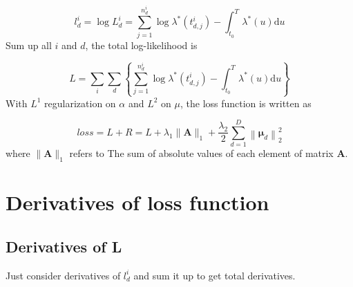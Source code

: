 \documentclass{article}
\begin{document}
		\begin{equation}
			l^i_d = \log L^i_d = \sum_{j=1}^{n^i_d}\log \lambda^*\left(t^i_{d, j}\right) - \int_{t_0}^{T}\lambda^*\left(u\right)\mathrm{d} u
		\end{equation}
		Sum up all $i$ and $d$, the total log-likelihood is

		\begin{equation}
			L = \sum_i\sum_d \left\{\sum_{j=1}^{n^i_d}\log \lambda^*\left(t^i_{d, j}\right) - \int_{t_0}^{T}\lambda^*\left(u\right)\mathrm{d} u\right\}
		\end{equation}
		With $L^1$ regularization on $\alpha$ and $L^2$ on $\mu$, the loss function is written as
		
		\begin{equation}
			loss = L + R = L + \lambda_{1}\|\boldsymbol{A}\|_{1}+\frac{\lambda_{2}}{2} \sum_{d=1}^{D}\left\|\boldsymbol{\mu}_{d}\right\|_{2}^{2}
		\end{equation}
		where $\|\boldsymbol{A}\|_{1}$ refers to The sum of absolute values of each element of matrix $\boldsymbol{A}$.
		
	\section{Derivatives of loss function}
		\subsection{Derivatives of L}
		
			Just consider derivatives of $l^i_d$ and sum it up to get total derivatives.
			
\end{document}

